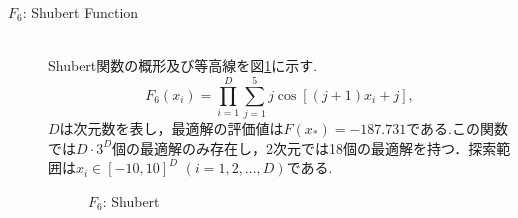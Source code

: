 \documentclass[a4j,11pt]{jarticle}
\begin{document}
\begin{description}
\item[$F_6$: Shubert Function]\mbox{}\\
Shubert関数の概形及び等高線を図\ref{fig:minF6}に示す.
 \begin{equation}
F_6(x_i) = \prod_{i=1}^D \sum_{j=1}^5 j \cos[(j+1)x_i+j], 
\end{equation}
$D$は次元数を表し，最適解の評価値は${F(x_*)=-187.731}$である.この関数では$D \cdot 3^D $個の最適解のみ存在し，2次元では18個の最適解を持つ．探索範囲は$x_i \in [-10, 10]^D$ $(i=1,2,...,D)$である.
\begin{figure}[h]
\centering
{}
\caption{$F_6$: Shubert}
\label{fig:minF6}
\end{figure}
\end{description}
\end{document}
